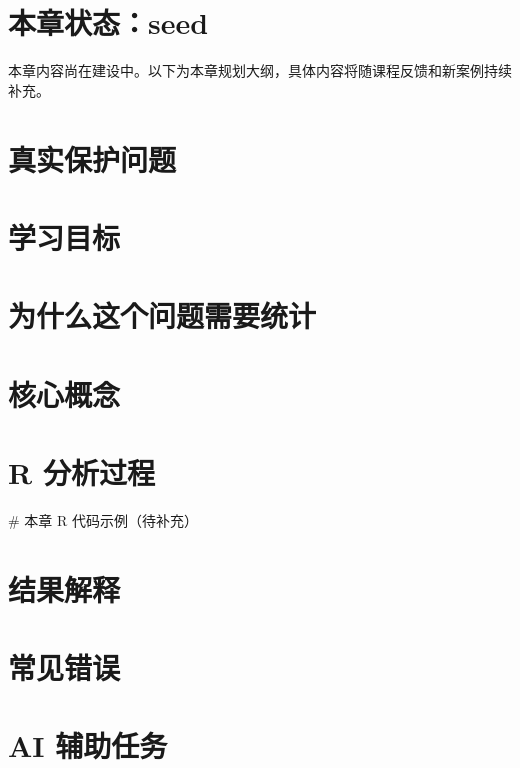 \documentclass[
  letterpaper,
]{scrbook}
\newenvironment{Shaded}{\begin{snugshade}}{\end{snugshade}}
\newcommand{\CommentTok}[1]{\textcolor[rgb]{0.37,0.37,0.37}{#1}}
\begin{document}
\section{本章状态：seed}\label{ux672cux7ae0ux72b6ux6001seed}

本章内容尚在建设中。以下为本章规划大纲，具体内容将随课程反馈和新案例持续补充。

\section{真实保护问题}\label{ux771fux5b9eux4fddux62a4ux95eeux9898-3}

\section{学习目标}\label{ux5b66ux4e60ux76eeux6807-3}

\section{为什么这个问题需要统计}\label{ux4e3aux4ec0ux4e48ux8fd9ux4e2aux95eeux9898ux9700ux8981ux7edfux8ba1}

\section{核心概念}\label{ux6838ux5fc3ux6982ux5ff5}

\section{R 分析过程}\label{r-ux5206ux6790ux8fc7ux7a0b}

\begin{Shaded}
\begin{Highlighting}[]
\CommentTok{\# 本章 R 代码示例（待补充）}
\end{Highlighting}
\end{Shaded}

\section{结果解释}\label{ux7ed3ux679cux89e3ux91ca}

\section{常见错误}\label{ux5e38ux89c1ux9519ux8bef-2}

\section{AI 辅助任务}\label{ai-ux8f85ux52a9ux4efbux52a1-1}
\end{document}
